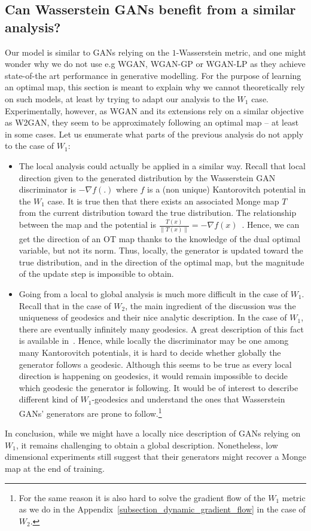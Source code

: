 \documentclass[runningheads]{llncs}
\begin{document}
\subsection{Can Wasserstein GANs benefit from a similar analysis?}
\label{sec:W1_case}
Our model is similar to GANs relying on the $1$-Wasserstein metric, and one might wonder why we do not use 
 e.g WGAN, WGAN-GP or WGAN-LP as they achieve state-of-the art performance in generative modelling. For the purpose of learning an optimal map, this section is meant to explain why we cannot theoretically rely on such models, at least by trying to adapt our analysis to the $W_1$ case. Experimentally, however, as WGAN and its extensions rely on a similar objective as W2GAN, they seem to be approximately following an optimal map -- at least in some cases. Let us enumerate what parts of the previous analysis do not apply to the case of $W_1$:
\begin{itemize}
    \item The local analysis could actually be applied in a similar way. Recall that local direction given to the generated distribution by the Wasserstein GAN discriminator is $-\nabla f(.)$ where $f$ is a (non unique) Kantorovitch potential in the $W_1$ case. It is true then that there exists an associated Monge map $T$ from the current distribution toward the true distribution. The relationship between the map and the potential is $\frac{T(x)}{\|T(x)\|}=-\nabla f(x)$~\citep{brenier1991polar}. Hence, we can get the direction of an OT map thanks to the knowledge of the dual optimal variable, but not its norm. Thus, locally, the generator is updated toward the true distribution, and in the direction of the optimal map, but the magnitude of the update step is impossible to obtain. 
    \item Going from a local to global analysis is much more difficult in the case of $W_1$. Recall that in the case of $W_2$, the main ingredient of the discussion was the uniqueness of geodesics and their nice analytic description. In the case of $W_1$, there are eventually infinitely many geodesics. A great description of this fact is available in~\citep{bottou2018geometrical}. Hence, while locally the discriminator may be one among many Kantorovitch potentials, it is hard to decide whether globally the generator follows a geodesic. Although this seems to be true as every local direction is happening on geodesics, it would remain impossible to decide which geodesic the generator is following. It would be of interest to describe different kind of $W_1$-geodesics and understand the ones that Wasserstein GANs' generators are prone to follow.\footnote{For the same reason it is also hard to solve the gradient flow of the $W_1$ metric as we do in the Appendix~\ref{subsection_dynamic_gradient_flow} 
    in the case of $W_2$.} 
\end{itemize}
In conclusion, while we might have a locally nice description of GANs relying on $W_1$, it remains challenging to obtain a global description. Nonetheless, low dimensional experiments still suggest that their generators might recover a Monge map at the end of training.
\end{document}
